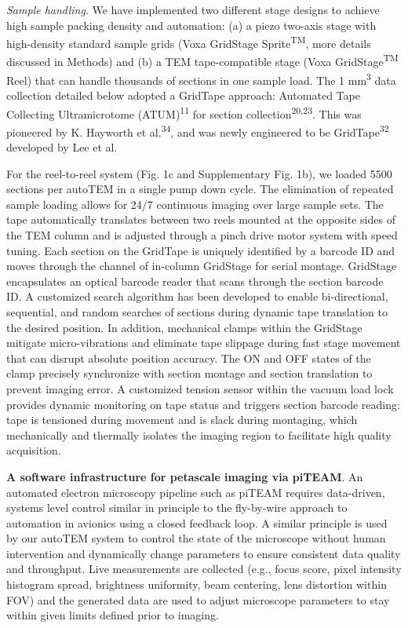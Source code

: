 \documentclass{article}
\begin{document}
\noindent\emph{Sample handling}. We have implemented two different stage designs to achieve high sample packing density and automation: (a) a piezo two-axis stage with high-density standard sample grids (Voxa GridStage Sprite\textsuperscript{TM}, more details discussed in Methods) and (b) a TEM tape-compatible stage (Voxa GridStage\textsuperscript{TM} Reel) that can handle thousands of sections in one sample load. The 1 mm\textsuperscript{3} data collection detailed below adopted a GridTape approach: Automated Tape Collecting Ultramicrotome (ATUM)\textsuperscript{11} for section collection\textsuperscript{20,23}. This was pioneered by K. Hayworth et al.\textsuperscript{34}, and was newly engineered to be GridTape\textsuperscript{32} developed by Lee et al.

For the reel-to-reel system (Fig. 1c and Supplementary Fig. 1b), we loaded 5500 sections per autoTEM in a single pump down cycle. The elimination of repeated sample loading allows for 24/7 continuous imaging over large sample sets. The tape automatically translates between two reels mounted at the opposite sides of the TEM column and is adjusted through a pinch drive motor system with speed tuning. Each section on the GridTape is uniquely identified by a barcode ID and moves through the channel of in-column GridStage for serial montage. GridStage encapsulates an optical barcode reader that scans through the section barcode ID. A customized search algorithm has been developed to enable bi-directional, sequential, and random searches of sections during dynamic tape translation to the desired position. In addition, mechanical clamps within the GridStage mitigate micro-vibrations and eliminate tape slippage during fast stage movement that can disrupt absolute position accuracy. The ON and OFF states of the clamp precisely synchronize with section montage and section translation to prevent imaging error. A customized tension sensor within the vacuum load lock provides dynamic monitoring on tape status and triggers section barcode reading: tape is tensioned during movement and is slack during montaging, which mechanically and thermally isolates the imaging region to facilitate high quality acquisition.

\noindent\textbf{A software infrastructure for petascale imaging via piTEAM}. An automated electron microscopy pipeline such as piTEAM requires data-driven, systems level control similar in principle to the fly-by-wire approach to automation in avionics using a closed feedback loop. A similar principle is used by our autoTEM system to control the state of the microscope without human intervention and dynamically change parameters to ensure consistent data quality and throughput. Live measurements are collected (e.g., focus score, pixel intensity histogram spread, brightness uniformity, beam centering, lens distortion within FOV) and the generated data are used to adjust microscope parameters to stay within given limits defined prior to imaging.
\end{document}
